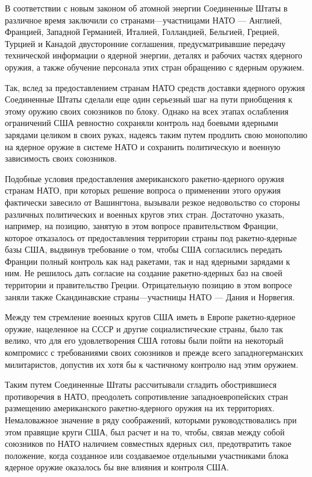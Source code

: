 \documentclass[12pt, a4paper, openany]{book}
\begin{document}
	В соответствии с новым законом об атомной энергии Соединенные Штаты в различное время заключили со странами—участницами НАТО — Англией, Францией, Западной Германией, Италией, Голландией, Бельгией, Грецией, Турцией и Канадой двусторонние соглашения, предусматривавшие передачу технической информации о ядерной энергии, деталях и рабочих частях ядерного оружия, а также обучение персонала этих стран обращению с ядерным оружием.
	
	Так, вслед за предоставлением странам НАТО средств доставки ядерного оружия Соединенные Штаты сделали еще один серьезный шаг на пути приобщения к этому оружию своих союзников по блоку. Однако на всех этапах ослабления ограничений США ревностно сохраняли контроль над боевыми ядерными зарядами целиком в своих руках, надеясь таким путем продлить свою монополию на ядерное оружие в системе НАТО и сохранить политическую и военную зависимость своих союзников.
	
	Подобные условия предоставления американского ракетно-ядерного оружия странам НАТО, при которых решение вопроса о применении этого оружия фактически завесило от Вашингтона, вызывали резкое недовольство со стороны различных политических и военных кругов этих стран. Достаточно указать, например, на позицию, занятую в этом вопросе правительством Франции, которое отказалось от предоставления территории страны под ракетно-ядерные базы США, выдвинув требование о том, чтобы США согласились передать Франции полный контроль как над ракетами, так и над ядерными зарядами к ним. Не решилось дать согласие на создание ракетно-ядерных баз на своей территории и правительство Греции. Отрицательную позицию в этом вопросе заняли также Скандинавские страны—участницы НАТО — Дания и Норвегия.
	
	Между тем стремление военных кругов США иметь в Европе ракетно-ядерное оружие, нацеленное на СССР и другие социалистические страны, было так велико, что для его удовлетворения США готовы были пойти на некоторый компромисс с требованиями своих союзников и прежде всего западногерманских милитаристов, допустив их хотя бы к частичному контролю над этим оружием.
	
	Таким путем Соединенные Штаты рассчитывали сгладить обострившиеся противоречия в НАТО, преодолеть сопротивление западноевропейских стран размещению американского ракетно-ядерного оружия на их территориях. Немаловажное значение в ряду соображений, которыми руководствовались при этом правящие круги США, был расчет и на то, чтобы, связав между собой союзников по НАТО наличием совместных ядерных сил, предотвратить такое положение, когда созданное или создаваемое отдельными участниками блока ядерное оружие оказалось бы вне влияния и контроля США.
	
\end{document}
